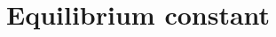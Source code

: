 \documentclass{book}
\begin{document}
 
 
 \newcommand\chapterlabel{}\newcommand\ChapterNameLabel{}\newcommand\labname{}\newcommand\chapterpathtocontent{}\newcommand\chapterpathtoimages{}\newcommand\chapterpath{} 

\section{Equilibrium constant}
\renewcommand\chapterlabel{Ch-equilibrium}\renewcommand\ChapterNameLabel{\chapterlabel}\renewcommand\labname{equilibriumconstant}\renewcommand\chapterpathtocontent{../../}\renewcommand\chapterpathtoimages{\chapterpathtocontent}\renewcommand\chapterpath{../../\chapterlabel/LAB-\labname/}


  
\end{document}
